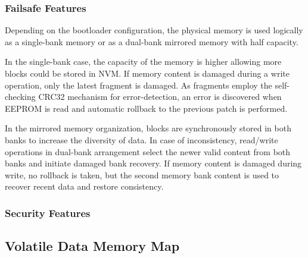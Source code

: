 
 
\subsubsection{Failsafe Features}\label{sec:arch:EEPROMMap:failsafe} 
 
 Depending on the bootloader configuration, the physical memory is used logically as a single-bank memory or as a dual-bank mirrored memory with half capacity. 

 
 In the single-bank case, the capacity of the memory is higher allowing more blocks could be stored in NVM. 
 If memory content is damaged during a write operation, only the latest fragment is damaged. 
 As fragments employ the self-checking CRC32 mechanism for error-detection, an error is discovered when EEPROM is read and automatic rollback to the previous patch is performed.

 In the mirrored memory organization, blocks are synchronously stored in both banks to increase the diversity of data. 
 In case of inconsistency, read/write operations in dual-bank arrangement select the newer valid content from both banks and initiate damaged bank recovery.
 If memory content is damaged during write, no rollback is taken, but the second memory bank content is used to recover recent data and restore consistency.
 
 
\subsubsection{Security Features}\label{sec:arch:EEPROMMap:sec}

\clearpage
\subsection{Volatile Data Memory Map} \label{sec:arch:RAMMap}

